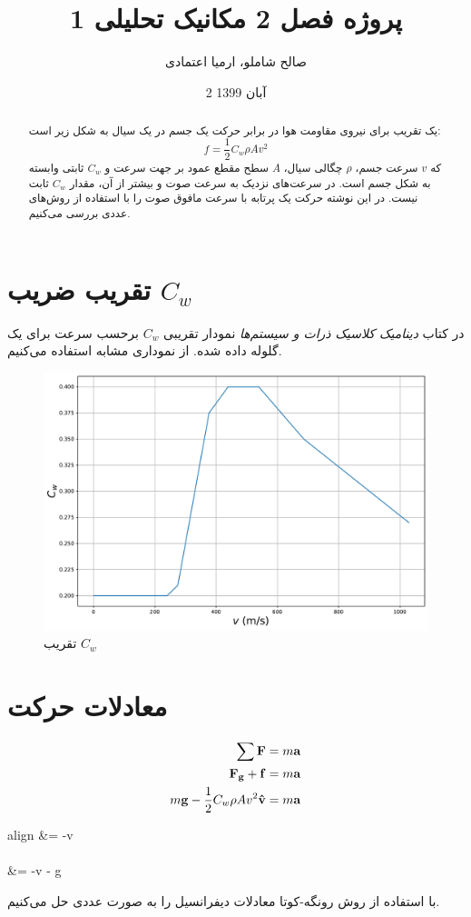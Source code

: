 \documentclass[a4paper,12pt]{article}
\title{پروژه فصل 2 مکانیک تحلیلی 1}
\author{صالح شاملو، ارمیا اعتمادی}
\date{2 آبان 1399}
\begin{document}
	\maketitle
	\begin{abstract}
		یک تقریب برای نیروی مقاومت هوا در برابر حرکت یک جسم در یک سیال به شکل زیر است:
		\begin{equation}
			f = \frac{1}{2}C_w \rho A v^2
		\end{equation}
		که $v$ سرعت جسم، $\rho$ چگالی سیال، $A$ سطح مقطع عمود بر جهت سرعت و $C_w$ ثابتی وابسته به شکل جسم است.
		در سرعت‌های نزدیک به سرعت صوت و بیشتر از آن، مقدار $C_w$ ثابت نیست. در این نوشته حرکت یک پرتابه با سرعت مافوق صوت را با استفاده از روش‌های عددی بررسی می‌کنیم.
	\end{abstract}
	\newpage
	\section{تقریب ضریب $C_w$}
	در کتاب \emph{دینامیک کلاسیک ذرات و سیستم‌ها} نمودار تقریبی $C_w$ برحسب سرعت برای یک گلوله داده شده.
	از نموداری مشابه استفاده می‌کنیم.
	\begin{figure}[h]
		\centering
		\includegraphics[width=\linewidth]{../figures/Cw}
		\caption{تقریب $C_w$}
	\end{figure}
	\section{معادلات حرکت}
	\begin{align}
		\sum \vb{F} &= m\vb{a} \\
		\vb{F_g} + \vb{f} &= m\vb{a} \\
		m\vb{g} - \frac{1}{2}C_w \rho A v^2 \vu{v} &= m\vb{a}
	\end{align}
	\begin{empheq}[left=\empheqlbrace]{align}
		 &= -v \\ \notag \\
		 &= -v - g
	\end{empheq}
	با استفاده از روش رونگه-کوتا معادلات دیفرانسیل را به صورت عددی حل می‌کنیم.
	 
\end{document}

